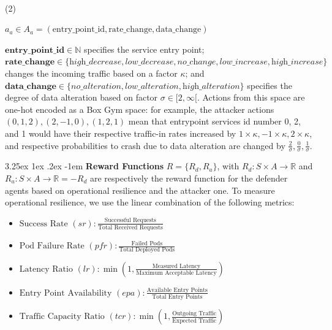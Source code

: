 \documentclass[conference]{IEEEtran}
\makeatletter
\renewcommand\paragraph{\@startsection{paragraph}{5}{\z@}%
  {3.25ex \@plus1ex \@minus.2ex}%
  {-1em}%
  {\normalfont\normalsize\bfseries}}
\makeatother
\begin{document}
\

\indent\begin{minipage}{0.06\linewidth}
    (2)
\end{minipage}
\begin{minipage}{0.9\linewidth}
    \raggedright
    $\displaystyle a_a \in A_a = (\text{entry\_point\_id}, \text{rate\_change}, \text{data\_change})$
\end{minipage}

\vspace{0.3cm}

\indent $\mathbf{entry\_point\_id} \in \mathbb{N}$ specifies the service entry point;
$\mathbf{rate\_change} \in \{\textit{high\_decrease}, \textit{low\_decrease}, \textit{no\_change}, \allowbreak \textit{low\_increase}, \allowbreak \textit{high\_increase}\}$ changes the incoming traffic based on a factor $\kappa$; and $\mathbf{data\_change} \in \{\textit{no\_alteration}, \allowbreak \textit{low\_alteration}, \allowbreak \textit{high\_alteration}\}$ specifies the degree of data alteration based on factor $\sigma \in [2,\infty[$. Actions from this space are one-hot encoded as a Box Gym space: for example, the attacker actions $(0,1,2), (2,-1,0), (1,2,1)$ mean that entrypoint services id number 0, 2, and 1 would have their respective traffic-in rates increased by $1 \times \kappa, -1 \times \kappa, 2 \times \kappa$, and respective probabilities to crash due to data alteration are changed by $\frac{2}{\sigma}, \frac{0}{\sigma}, \frac{1}{\sigma}$.


\noindent \paragraph{\textbf{Reward Functions}} $R = \{R_d, R_a\}$, with $R_d: S \times A \to \mathbb{R}$ and $R_a: S \times A \to \mathbb{R} = - R_d$ are respectively the reward function for the defender agents based on operational resilience and the attacker one.
To measure operational resilience, we use the linear combination of the following metrics:
%
\begin{itemize}
    \vspace{0.15cm}
    \item $\text{Success Rate } (sr) : \frac{\text{Successful Requests}}{\text{Total Received Requests}}$
          \vspace{0.15cm}
    \item $\text{Pod Failure Rate } (pfr) : \frac{\text{Failed Pods}}{\text{Total Deployed Pods}}$
          \vspace{0.15cm}
    \item $\text{Latency Ratio } (lr) : \min\left(1,\frac{\text{Measured Latency}}{\text{Maximum Acceptable Latency}}\right)$
          \vspace{0.15cm}
    \item $\text{Entry Point Availability } (epa) : \frac{\text{Available Entry Points}}{\text{Total Entry Points}}$
          \vspace{0.15cm}
    \item $\text{Traffic Capacity Ratio } (tcr) : \min\left(1, \frac{\text{Outgoing Traffic}}{\text{Expected Traffic}}\right)$
\end{itemize}
\end{document}
